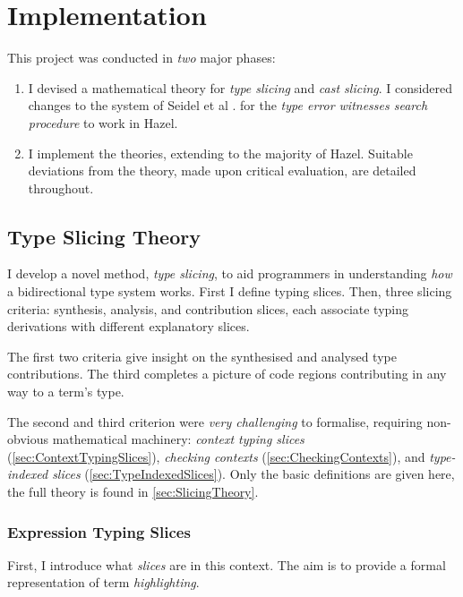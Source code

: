 \chapter{Implementation}\label{chap:Implementation}
This project was conducted in \textit{two} major phases:
\begin{enumerate}
\item I devised a mathematical theory for \textit{type slicing} and \textit{cast slicing}. I considered changes to the system of Seidel et al \cite{SearchProc}. for the \textit{type error witnesses search procedure} to work in Hazel.  

\item I implement the theories, extending to the majority of Hazel. Suitable deviations from the theory, made upon critical evaluation, are detailed throughout.
\end{enumerate}

\section{Type Slicing Theory}\label{sec:TypeSlicingTheory}

I develop a novel method, \textit{type slicing}, to aid programmers in understanding \textit{how} a bidirectional type system works. First I define typing slices. Then, three slicing criteria: synthesis, analysis, and contribution slices, each associate typing derivations with different explanatory slices. 

The first two criteria give insight on the synthesised and analysed type contributions. The third completes a picture of code regions contributing in any way to a term's type.

The second and third criterion were \textit{very challenging} to formalise, requiring non-obvious mathematical machinery: \textit{context typing slices} (\cref{sec:ContextTypingSlices}), \textit{checking contexts} (\cref{sec:CheckingContexts}), and \textit{type-indexed slices} (\cref{sec:TypeIndexedSlices}). Only the basic definitions are given here, the full theory is found in \cref{sec:SlicingTheory}.

\subsection{Expression Typing Slices}\label{sec:ExpressionTypingSlices}
First, I introduce what \textit{slices} are in this context. The aim is to provide a formal representation of term \textit{highlighting}. 

